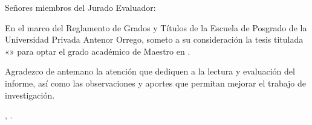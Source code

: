 
\vspace{.08\textheight}

Señores miembros del Jurado Evaluador:

En el marco del Reglamento de Grados y Títulos de la Escuela de Posgrado
de la Universidad Privada Antenor Orrego, someto a su consideración la
tesis titulada «\textbf{\tituloTesis}» para optar el grado académico de
Maestro en \programaTesis.

Agradezco de antemano la atención que dediquen a la lectura y evaluación
del informe, así como las observaciones y aportes que permitan mejorar
el trabajo de investigación.

\noindent\ciudadTesis, \fechaPreliminaresTesis.\par

\vfill
\noindent\autorTesis\par
\vspace*{.15\textheight}
